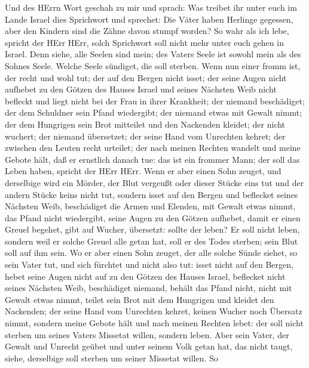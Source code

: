  Und des HErrn Wort geschah zu mir und sprach: 
Was treibet ihr unter euch im Lande Israel dies Sprichwort und sprechet:
Die Väter haben Herlinge gegessen, aber den Kindern sind die Zähne davon
stumpf worden?  So wahr als ich lebe, spricht der HErr HErr,
solch Sprichwort soll nicht mehr unter euch gehen in Israel.
 Denn siehe, alle Seelen sind mein; des Vaters Seele ist
sowohl mein als des Sohnes Seele. Welche Seele sündiget, die soll
sterben.  Wenn nun einer fromm ist, der recht und wohl tut;
 der auf den Bergen nicht isset; der seine Augen nicht
aufhebet zu den Götzen des Hauses Israel und seines Nächsten Weib nicht
befleckt und liegt nicht bei der Frau in ihrer Krankheit; 
der niemand beschädiget; der dem Schuldner sein Pfand wiedergibt; der
niemand etwas mit Gewalt nimmt; der dem Hungrigen sein Brot mitteilet
und den Nackenden kleidet;  der nicht wuchert; der niemand
übersetzet; der seine Hand vom Unrechten kehret; der zwischen den Leuten
recht urteilet;  der nach meinen Rechten wandelt und meine
Gebote hält, daß er ernstlich danach tue: das ist ein frommer Mann; der
soll das Leben haben, spricht der HErr HErr.  Wenn er aber
einen Sohn zeuget, und derselbige wird ein Mörder, der Blut vergeußt
oder dieser Stücke eins tut  und der andern Stücke keins
nicht tut, sondern isset auf den Bergen und beflecket seines Nächsten
Weib,  beschädiget die Armen und Elenden, mit Gewalt etwas
nimmt, das Pfand nicht wiedergibt, seine Augen zu den Götzen aufhebet,
damit er einen Greuel begehet,  gibt auf Wucher, übersetzt:
sollte der leben? Er soll nicht leben, sondern weil er solche Greuel
alle getan hat, soll er des Todes sterben; sein Blut soll auf ihm sein.
 Wo er aber einen Sohn zeuget, der alle solche Sünde
siehet, so sein Vater tut, und sich fürchtet und nicht also tut:
 isset nicht auf den Bergen, hebet seine Augen nicht auf zu
den Götzen des Hauses Israel, beflecket nicht seines Nächsten Weib,
 beschädiget niemand, behält das Pfand nicht, nicht mit
Gewalt etwas nimmt, teilet sein Brot mit dem Hungrigen und kleidet den
Nackenden;  der seine Hand vom Unrechten kehret, keinen
Wucher noch Übersatz nimmt, sondern meine Gebote hält und nach meinen
Rechten lebet: der soll nicht sterben um seines Vaters Missetat willen,
sondern leben.  Aber sein Vater, der Gewalt und Unrecht
geübet und unter seinem Volk getan hat, das nicht taugt, siehe,
derselbige soll sterben um seiner Missetat willen.  So
